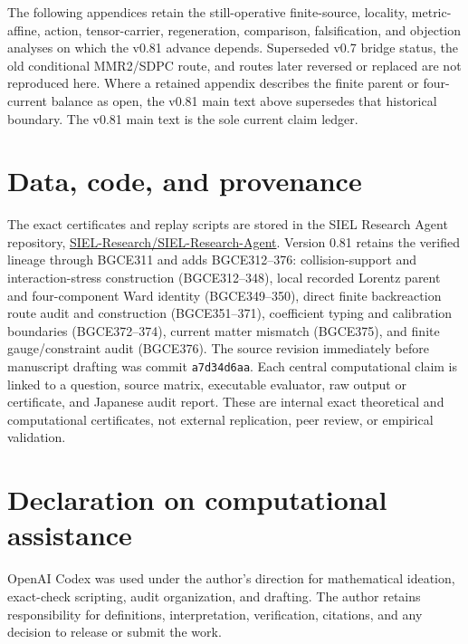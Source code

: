 \documentclass[11pt]{article}
\theoremstyle{definition}
\theoremstyle{remark}
\begin{document}
The following appendices retain the still-operative finite-source, locality, metric-affine, action, tensor-carrier, regeneration, comparison, falsification, and objection analyses on which the v0.81 advance depends. Superseded v0.7 bridge status, the old conditional MMR2/SDPC route, and routes later reversed or replaced are not reproduced here. Where a retained appendix describes the finite parent or four-current balance as open, the v0.81 main text above supersedes that historical boundary. The v0.81 main text is the sole current claim ledger.



\section*{Data, code, and provenance}

The exact certificates and replay scripts are stored in the SIEL Research Agent repository,
\href{https://github.com/SIEL-Research/SIEL-Research-Agent}{SIEL-Research/SIEL-Research-Agent}. Version 0.81 retains the verified lineage through BGCE311 and adds BGCE312--376: collision-support and interaction-stress construction (BGCE312--348), local recorded Lorentz parent and four-component Ward identity (BGCE349--350), direct finite backreaction route audit and construction (BGCE351--371), coefficient typing and calibration boundaries (BGCE372--374), current matter mismatch (BGCE375), and finite gauge/constraint audit (BGCE376). The source revision immediately before manuscript drafting was commit \texttt{a7d34d6aa}. Each central computational claim is linked to a question, source matrix, executable evaluator, raw output or certificate, and Japanese audit report. These are internal exact theoretical and computational certificates, not external replication, peer review, or empirical validation.

\section*{Declaration on computational assistance}

OpenAI Codex was used under the author's direction for mathematical ideation, exact-check scripting, audit organization, and drafting. The author retains responsibility for definitions, interpretation, verification, citations, and any decision to release or submit the work.
\end{document}
